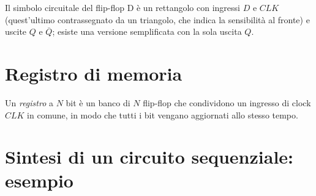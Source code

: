 \documentclass[11pt,a4paper]{article}
\begin{document}
Il simbolo circuitale del flip-flop D è un rettangolo con ingressi $D$ e $CLK$ (quest'ultimo contrassegnato da un triangolo, che indica la sensibilità al fronte) e uscite $Q$ e $\overline{Q}$; esiste una versione semplificata con la sola uscita $Q$.

\section{Registro di memoria}

\begin{definizione}
Un \emph{registro} a $N$ bit è un banco di $N$ flip-flop che condividono un ingresso di clock $CLK$ in comune, in modo che tutti i bit vengano aggiornati allo stesso tempo.
\end{definizione}

\section{Sintesi di un circuito sequenziale: esempio}
\end{document}
